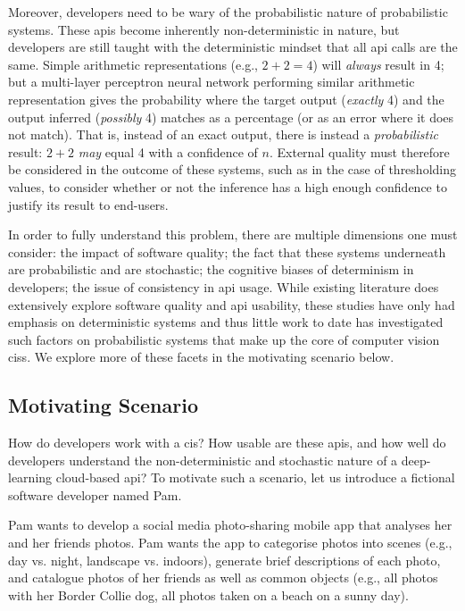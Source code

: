 Moreover, developers need to be wary of the probabilistic nature of probabilistic systems. These \glspl{api} become inherently non-deterministic in nature, but developers are still taught with the deterministic mindset that all \gls{api} calls are the same. Simple arithmetic representations (e.g., $2+2=4$) will \textit{always} result in 4; but a multi-layer perceptron neural network performing similar arithmetic representation \citep{Blake:1998vd} gives the probability where the target output (\textit{exactly} 4) and the output inferred (\textit{possibly} 4) matches as a percentage (or as an error where it does not match). That is, instead of an exact output, there is instead a \textit{probabilistic} result: $2+2$ \textit{may} equal 4 with a confidence of $n$. External quality must therefore be considered in the outcome of these systems, such as in the case of thresholding values, to consider whether or not the inference has a high enough confidence to justify its result to end-users.

In order to fully understand this problem, there are multiple dimensions one must consider: the impact of software quality; the fact that these systems underneath are probabilistic and are stochastic; the cognitive biases of determinism in developers; the issue of consistency in \gls{api} usage. While existing literature does extensively explore software quality and \gls{api} usability, these studies have only had emphasis on deterministic systems and thus little work to date has investigated such factors on probabilistic systems that make up the core of computer vision \glspl{cis}. We explore more of these facets in the motivating scenario below.

\subsection{Motivating Scenario}
\label{ssec:introduction:motivation:scenario}

  How do developers work with a \gls{cis}? How usable are these \glspl{api}, and how well do developers understand the non-deterministic and stochastic nature of a deep-learning cloud-based \gls{api}? To motivate such a scenario, let us introduce a fictional software developer named Pam.

Pam wants to develop a social media photo-sharing mobile app that analyses her and her friends photos. Pam wants the app to categorise photos into scenes (e.g., day vs. night, landscape vs. indoors), generate brief descriptions of each photo, and catalogue photos of her friends as well as common objects (e.g., all photos with her Border Collie dog, all photos taken on a beach on a sunny day).

